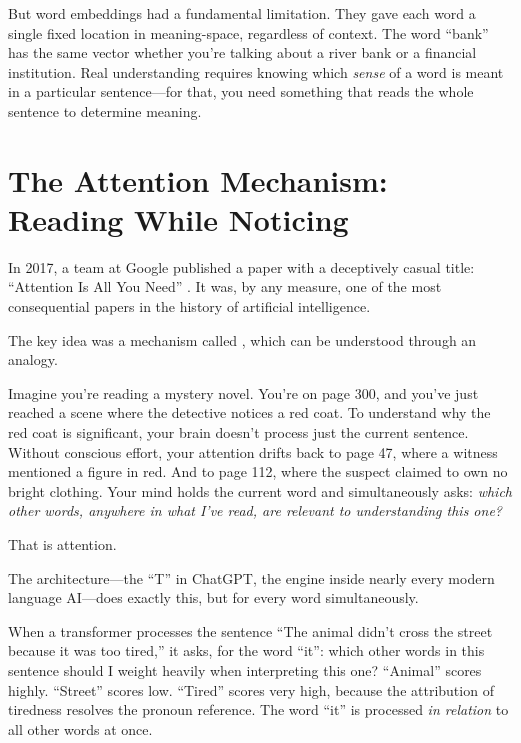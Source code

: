 But word embeddings had a fundamental limitation. They gave each word a single fixed location in meaning-space, regardless of context. The word ``bank'' has the same vector whether you're talking about a river bank or a financial institution. Real understanding requires knowing which \emph{sense} of a word is meant in a particular sentence---for that, you need something that reads the whole sentence to determine meaning.

\section{The Attention Mechanism: Reading While Noticing}
\label{sec:attention}

In 2017, a team at Google published a paper with a deceptively casual title: ``Attention Is All You Need'' \autocite{vaswani2017attention}. It was, by any measure, one of the most consequential papers in the history of artificial intelligence.

The key idea was a mechanism called , which can be understood through an analogy.

Imagine you're reading a mystery novel. You're on page 300, and you've just reached a scene where the detective notices a red coat. To understand why the red coat is significant, your brain doesn't process just the current sentence. Without conscious effort, your attention drifts back to page 47, where a witness mentioned a figure in red. And to page 112, where the suspect claimed to own no bright clothing. Your mind holds the current word and simultaneously asks: \emph{which other words, anywhere in what I've read, are relevant to understanding this one?}

That is attention.

The  architecture---the ``T'' in ChatGPT, the engine inside nearly every modern language AI---does exactly this, but for every word simultaneously.

When a transformer processes the sentence ``The animal didn't cross the street because it was too tired,'' it asks, for the word ``it'': which other words in this sentence should I weight heavily when interpreting this one? ``Animal'' scores highly. ``Street'' scores low. ``Tired'' scores very high, because the attribution of tiredness resolves the pronoun reference. The word ``it'' is processed \emph{in relation} to all other words at once.

